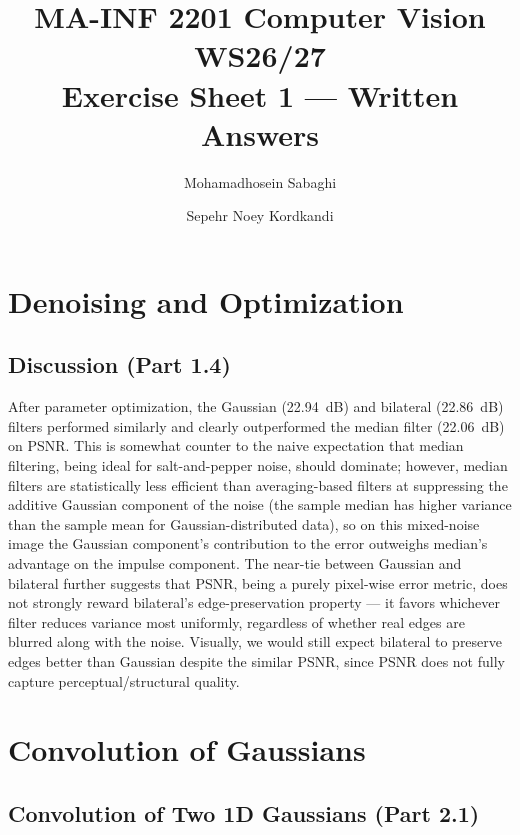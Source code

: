 \documentclass[11pt]{article}
\title{MA-INF 2201 Computer Vision WS26/27 \\ Exercise Sheet 1 --- Written Answers}
\author{Mohamadhosein Sabaghi \and Sepehr Noey Kordkandi}
\date{}
\begin{document}
\maketitle

\section{Denoising and Optimization}

\subsection{Discussion (Part 1.4)}

After parameter optimization, the Gaussian (22.94~dB) and bilateral
(22.86~dB) filters performed similarly and clearly outperformed the median
filter (22.06~dB) on PSNR. This is somewhat counter to the naive expectation
that median filtering, being ideal for salt-and-pepper noise, should
dominate; however, median filters are statistically less efficient than
averaging-based filters at suppressing the additive Gaussian component of
the noise (the sample median has higher variance than the sample mean for
Gaussian-distributed data), so on this mixed-noise image the Gaussian
component's contribution to the error outweighs median's advantage on the
impulse component. The near-tie between Gaussian and bilateral further
suggests that PSNR, being a purely pixel-wise error metric, does not
strongly reward bilateral's edge-preservation property --- it favors
whichever filter reduces variance most uniformly, regardless of whether
real edges are blurred along with the noise. Visually, we would still
expect bilateral to preserve edges better than Gaussian despite the similar
PSNR, since PSNR does not fully capture perceptual/structural quality.

\section{Convolution of Gaussians}

\subsection{Convolution of Two 1D Gaussians (Part 2.1)}
\end{document}
